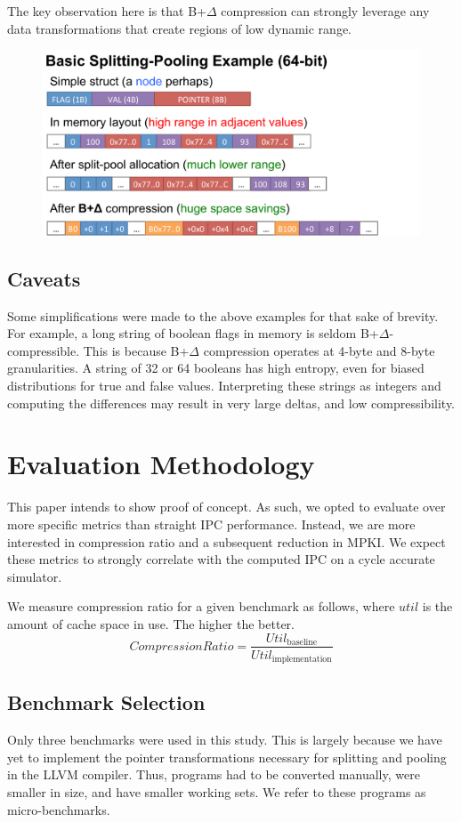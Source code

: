 \documentclass[pageno]{jpaper}
\begin{document}
The key observation here is that B+$\Delta$ compression  can strongly leverage any data transformations that create regions of low dynamic range.

\begin{figure}[bp]
  \centering
    \includegraphics[scale=0.27]{mechanisms.pdf}
\end{figure}

\subsection{Caveats}
Some simplifications were made to the above examples for that sake of brevity. For example, a long string of boolean flags in memory is seldom B+$\Delta$-compressible. This is because B+$\Delta$ compression operates at 4-byte and 8-byte granularities. A string of 32 or 64 booleans has high entropy, even for biased distributions for true and false values. Interpreting these strings as integers and computing the differences may result in very large deltas, and low compressibility.


\section{Evaluation Methodology}
This paper intends to show proof of concept. As such, we opted to evaluate over more specific metrics than straight IPC performance. Instead, we are more interested in compression ratio and a subsequent reduction in MPKI. We expect these metrics to strongly correlate with the computed IPC on a cycle accurate simulator.

We measure compression ratio for a given benchmark as follows, where $util$ is the amount of cache space in use. The higher the better.
\[
CompressionRatio = \frac{Util_{\text{baseline}}}{Util_{\text{implementation}}}
\]

\subsection{Benchmark Selection}
Only three benchmarks were used in this study. This is largely because we have yet to implement the pointer transformations necessary for splitting and pooling in the LLVM compiler. Thus, programs had to be converted manually, were smaller in size, and have smaller working sets. We refer to these programs as micro-benchmarks.
\end{document}
